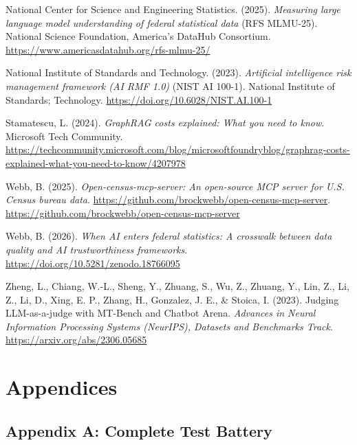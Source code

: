 \documentclass[
  11pt,
  letterpaper,
]{article}
\newlength{\cslhangindent}
\newenvironment{CSLReferences}[2] %
 {\begin{list}{}{%
  \setlength{\itemindent}{0pt}
  \setlength{\leftmargin}{0pt}
  \setlength{\parsep}{0pt}
  \ifodd #1
   \setlength{\leftmargin}{\cslhangindent}
   \setlength{\itemindent}{-1\cslhangindent}
  \fi
  \setlength{\itemsep}{#2\baselineskip}}}
 {\end{list}}
\begin{document}
\begin{CSLReferences}{1}{0}
National Center for Science and Engineering Statistics. (2025).
\emph{Measuring large language model understanding of federal
statistical data} (RFS MLMU-25). National Science Foundation, America's
DataHub Consortium. \url{https://www.americasdatahub.org/rfs-mlmu-25/}

National Institute of Standards and Technology. (2023). \emph{Artificial
intelligence risk management framework ({AI RMF} 1.0)} (NIST AI 100-1).
National Institute of Standards; Technology.
\url{https://doi.org/10.6028/NIST.AI.100-1}

Stamatescu, L. (2024). \emph{{GraphRAG} costs explained: What you need
to know}. Microsoft Tech Community.
\url{https://techcommunity.microsoft.com/blog/microsoftfoundryblog/graphrag-costs-explained-what-you-need-to-know/4207978}

Webb, B. (2025). \emph{Open-census-mcp-server: An open-source {MCP}
server for {U.S.} Census bureau data}.
\url{https://github.com/brockwebb/open-census-mcp-server}.
\url{https://github.com/brockwebb/open-census-mcp-server}

Webb, B. (2026). \emph{When {AI} enters federal statistics: A crosswalk
between data quality and {AI} trustworthiness frameworks}.
\url{https://doi.org/10.5281/zenodo.18766095}

Zheng, L., Chiang, W.-L., Sheng, Y., Zhuang, S., Wu, Z., Zhuang, Y.,
Lin, Z., Li, Z., Li, D., Xing, E. P., Zhang, H., Gonzalez, J. E., \&
Stoica, I. (2023). Judging {LLM}-as-a-judge with {MT-Bench} and {Chatbot
Arena}. \emph{Advances in Neural Information Processing Systems
(NeurIPS), Datasets and Benchmarks Track}.
\url{https://arxiv.org/abs/2306.05685}

\end{CSLReferences}

\section{Appendices}\label{appendices}

\subsection{Appendix A: Complete Test
Battery}\label{appendix-a-complete-test-battery}
\end{document}
